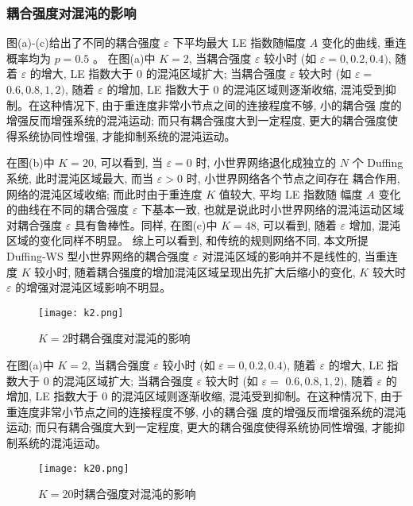 \subsubsection{耦合强度对混沌的影响}
图(a)-(c)给出了不同的耦合强度 $\varepsilon$ 下平均最大 LE 指数随幅度 $A$ 变化的曲线, 重连概率均为 $p=0.5$ 。
在图(a)中 $K=2$, 当耦合强度 $\varepsilon$ 较小时 (如 $\varepsilon=0,0.2,0.4)$, 随着 $\varepsilon$ 的增大,
LE 指数大于 0 的混沌区域扩大; 当耦合强度 $\varepsilon$ 较大时 (如 $\varepsilon=$ $0.6,0.8,1,2)$, 
随着 $\varepsilon$ 的增加, LE 指数大于 0 的混沌区域则逐渐收缩, 混沌受到抑制。在这种情况下, 
由于重连度非常小节点之间的连接程度不够, 小的耦合强 度的增强反而增强系统的混沌运动; 而只有耦合强度大到一定程度, 
更大的耦合强度使得系统协同性增强, 才能抑制系统的混沌运动。\par
在图(b)中 $K=20$, 可以看到, 当 $\varepsilon=0$ 时, 小世界网络退化成独立的 $N$ 个 Duffing系统, 此时混沌区域最大, 
而当 $\varepsilon>0$ 时, 小世界网络各个节点之间存在 耦合作用, 网络的混沌区域收缩; 而此时由于重连度 $K$ 值较大, 平均 LE 指数随
幅度 $A$ 变化的曲线在不同的耦合强度 $\varepsilon$ 下基本一致, 也就是说此时小世界网络的混沌运动区域对耦合强度 
$\varepsilon$ 具有鲁棒性。同样, 在图(c)中 $K=48$, 可以看到, 随着 $\varepsilon$ 增加, 混沌区域的变化同样不明显。
综上可以看到, 和传统的规则网络不同, 本文所提 Duffing-WS 型小世界网络的耦合强度 $\varepsilon$ 
对混沌区域的影响并不是线性的, 当重连度 $K$ 较小时, 随着耦合强度的增加混沌区域呈现出先扩大后缩小的变化, 
$K$ 较大时 $\varepsilon$ 的增强对混沌区域影响不明显。\par
\begin{figure}[!htbp]
    \centering
    \texttt{[image: k2.png]}
    \caption{$K=2$时耦合强度对混沌的影响}
\end{figure}
在图(a)中 $K=2$, 当耦合强度 $\varepsilon$ 较小时 (如 $\varepsilon=0,0.2,0.4)$, 随着 $\varepsilon$ 的增大,
LE 指数大于 0 的混沌区域扩大; 当耦合强度 $\varepsilon$ 较大时 (如 $\varepsilon=$ $0.6,0.8,1,2)$,
随着 $\varepsilon$ 的增加, LE 指数大于 0 的混沌区域则逐渐收缩, 混沌受到抑制。在这种情况下,
由于重连度非常小节点之间的连接程度不够, 小的耦合强 度的增强反而增强系统的混沌运动; 而只有耦合强度大到一定程度,
更大的耦合强度使得系统协同性增强, 才能抑制系统的混沌运动。\par
\begin{figure}[!htbp]
    \centering
    \texttt{[image: k20.png]}
    \caption{$K=20$时耦合强度对混沌的影响}
\end{figure}

